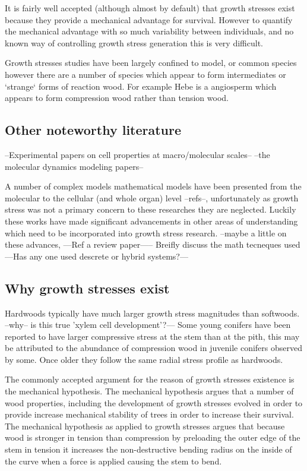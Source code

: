 \documentclass{article}
\begin{document}
It is fairly well accepted (although almost by default) that growth stresses
exist because they provide a mechanical advantage for survival. However to
quantify the mechanical advantage with so much variability between individuals,
and no known way of controlling growth stress generation this is very difficult.

Growth stresses studies have been largely confined to model, or common species
however there are a number of species which appear to form intermediates or
`strange` forms of reaction wood. For example Hebe is a angiosperm which appears
to form compression wood rather than tension wood.

\subsection{Other noteworthy literature}
--Experimental papers on cell properties at macro/molecular scales--
--the molecular dynamics modeling papers--

A number of complex models mathematical models have been presented from the
molecular to the cellular (and whole organ) level --refs--, unfortunately as
growth stress was not a primary concern to these researches they are neglected.
Luckily these works have made significant advancements in other areas of
understanding which need to be incorporated into growth stress research. --maybe
a little on these advances, ---Ref a review paper----- Breifly discuss the math
tecneques used---Has any one used descrete or hybrid systems?---

\subsection{Why growth stresses exist}
Hardwoods typically have much larger growth stress magnitudes than softwoods.
--why-- is this true 'xylem cell development'?--- Some young conifers have been
reported to have larger compressive stress at the stem than at the pith,
this may be attributed to the abundance of compression wood in juvenile
conifers observed by some. Once older they follow the same radial stress profile
as hardwoods.

The commonly accepted argument for the reason of growth stresses existence is
the mechanical hypothesis. The mechanical hypothesis argues that a number of wood
properties, including the development of growth stresses evolved in order to
provide increase mechanical stability of trees in order to increase their
survival. The mechanical hypothesis as applied to growth stresses argues that
because wood is stronger in tension than compression by preloading the outer
edge of the stem in tension it increases the non-destructive bending radius on
the inside of the curve when a force is applied causing the stem to bend.
\end{document}
